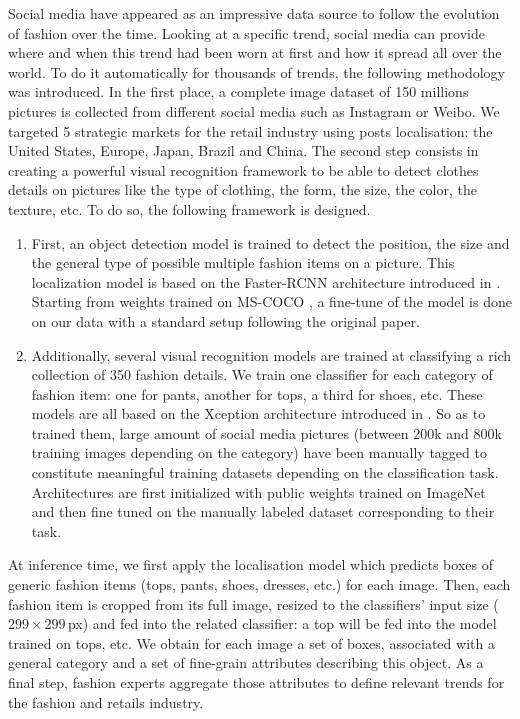 \documentclass[review]{elsarticle}
\begin{document}
Social media have appeared as an impressive data source to follow the evolution of fashion over the time. Looking at a specific trend, social media can provide where and when this trend had been worn at first and how it spread all over the world. To do it automatically for thousands of trends, the following methodology was introduced. In the first place, a complete image dataset of 150 millions pictures is collected from different social media such as Instagram or Weibo. We targeted 5 strategic markets for the retail industry using posts localisation: the United States, Europe, Japan, Brazil and China. 
The second step consists in creating a powerful visual recognition framework to be able to detect clothes details on pictures like the type of clothing, the form, the size, the color, the texture, etc. To do so, the following framework is designed.
\begin{enumerate}
    \item First, an object detection model is trained to detect the position, the size and the general type of possible multiple fashion items on a picture. This localization model is based on the Faster-RCNN architecture introduced in \cite{ren2015}. Starting from weights trained on MS-COCO \cite{lin2014}, a fine-tune of the model is done on our data with a standard setup following the original paper.
    \item  Additionally, several visual recognition models are trained at classifying a rich collection of 350 fashion details. We train one classifier for each category of fashion item: one for pants, another for tops, a third for shoes, etc. These models are all based on the Xception architecture introduced in \cite{chollet2017}. So as to trained them, large amount of social media pictures (between 200k and 800k training images depending on the category) have been manually tagged to constitute meaningful training datasets depending on the classification task. Architectures are first initialized with public weights trained on ImageNet \cite{russakovsky2014} and then fine tuned on the manually labeled dataset corresponding to their task.
\end{enumerate}

At inference time, we first apply the localisation model which predicts boxes of generic fashion items (tops, pants, shoes, dresses, etc.) for each image. Then, each fashion item is cropped from its full image, resized to the classifiers' input size ($299\times299\,$px) and fed into the related classifier: a top will be fed into the model trained on tops, etc. We obtain for each image a set of boxes, associated with a general category and a set of fine-grain attributes describing this object. As a final step, fashion experts aggregate those attributes to define relevant trends for the fashion and retails industry.
\end{document}
